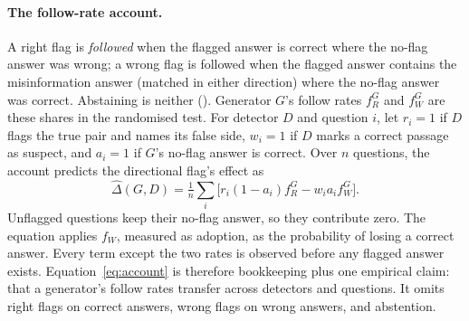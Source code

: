 \paragraph{The follow-rate account.}
A right flag is \emph{followed} when the flagged answer is correct where the no-flag answer was wrong; a wrong flag
is followed when the flagged answer contains the misinformation answer (matched in either direction) where the
no-flag answer was correct. Abstaining is neither (). Generator $G$'s follow rates
$f_R^G$ and $f_W^G$ are these shares in the randomised test. For detector $D$ and question $i$, let $r_i=1$ if $D$
flags the true pair and names its false side, $w_i=1$ if $D$ marks a correct passage as suspect, and $a_i=1$ if
$G$'s no-flag answer is correct. Over $n$ questions, the account predicts the directional flag's effect as
\begin{equation}
\hat\Delta(G,D)=\tfrac{1}{n}\textstyle\sum_{i}\big[r_i(1-a_i)f_R^G-w_ia_if_W^G\big].
\label{eq:account}
\end{equation}
Unflagged questions keep their no-flag answer, so they contribute zero. The equation applies $f_W$, measured as
adoption, as the probability of losing a correct answer. Every term except the two rates is observed
before any flagged answer exists. Equation~\eqref{eq:account} is therefore bookkeeping plus one empirical claim: that
a generator's follow rates transfer across detectors and questions. It omits right flags on correct answers, wrong
flags on wrong answers, and abstention.

